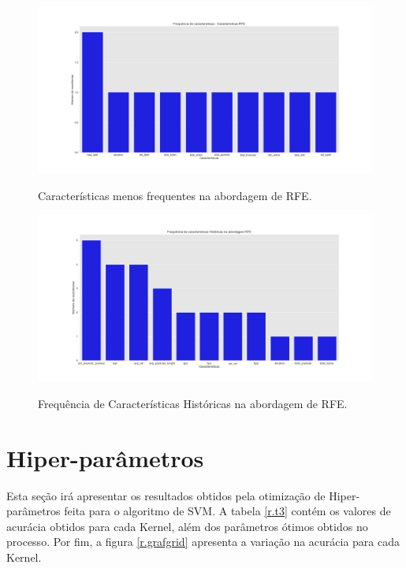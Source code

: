 \begin{figure}[h]
\caption{Características menos frequentes na abordagem de RFE.}
\centering
\includegraphics[scale=0.35]{figs/CaracteristicasMetodo2-menos.png}
\label{r.graf5}
\end{figure}

\begin{figure}[h]
\caption{Frequência de Características Históricas na abordagem de RFE.}
\centering
\includegraphics[scale=0.35]{figs/CaracteristicasSVM.png}
\label{r.graf6}
\end{figure}

\section{Hiper-parâmetros}

Esta seção irá apresentar os resultados obtidos pela otimização de Hiper-parâmetros feita para o algoritmo de SVM. A tabela \ref{r.t3} contém os valores de acurácia obtidos para cada Kernel, além dos parâmetros ótimos obtidos no processo. Por fim, a figura \ref{r.grafgrid} apresenta a variação na acurácia para cada Kernel.

